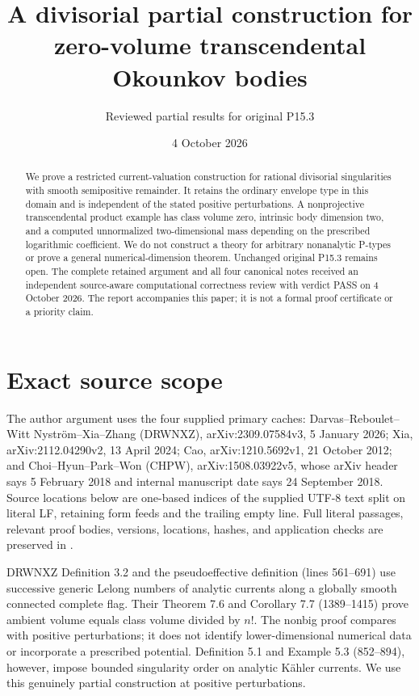 \documentclass[11pt]{article}
\title{A divisorial partial construction for zero-volume transcendental Okounkov bodies}
\author{Reviewed partial results for original P15.3}
\date{4 October 2026}
\begin{document}
\maketitle
\begin{abstract}
We prove a restricted current-valuation construction for rational divisorial singularities with smooth semipositive remainder. It retains the ordinary envelope type in this domain and is independent of the stated positive perturbations. A nonprojective transcendental product example has class volume zero, intrinsic body dimension two, and a computed unnormalized two-dimensional mass depending on the prescribed logarithmic coefficient. We do not construct a theory for arbitrary nonanalytic P-types or prove a general numerical-dimension theorem. Unchanged original P15.3 remains open. The complete retained argument and all four canonical notes received an independent source-aware computational correctness review with verdict PASS on 4 October 2026. The report accompanies this paper; it is not a formal proof certificate or a priority claim.
\end{abstract}

\section{Exact source scope}
The author argument uses the four supplied primary caches: Darvas--Reboulet--Witt Nystr\"om--Xia--Zhang (DRWNXZ), arXiv:2309.07584v3, 5 January 2026; Xia, arXiv:2112.04290v2, 13 April 2024; Cao, arXiv:1210.5692v1, 21 October 2012; and Choi--Hyun--Park--Won (CHPW), arXiv:1508.03922v5, whose arXiv header says 5 February 2018 and internal manuscript date says 24 September 2018. Source locations below are one-based indices of the supplied UTF-8 text split on literal LF, retaining form feeds and the trailing empty line. Full literal passages, relevant proof bodies, versions, locations, hashes, and application checks are preserved in .

DRWNXZ Definition 3.2 and the pseudoeffective definition (lines 561--691) use successive generic Lelong numbers of analytic currents along a globally smooth connected complete flag. Their Theorem 7.6 and Corollary 7.7 (1389--1415) prove ambient volume equals class volume divided by $n!$. The nonbig proof compares with positive perturbations; it does not identify lower-dimensional numerical data or incorporate a prescribed potential. Definition 5.1 and Example 5.3 (852--894), however, impose bounded singularity order on analytic K\"ahler currents. We use this genuinely partial construction at positive perturbations.
\end{document}
